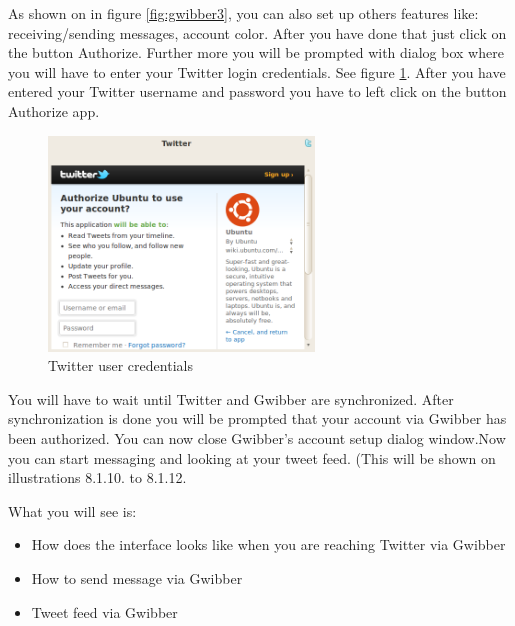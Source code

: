 \par \noindent As shown on in figure \ref{fig:gwibber3}, you can also set up others features like: receiving/sending messages, account color. After you have done that just click on the button Authorize. Further more you will be prompted with dialog box where you will have to enter your Twitter login credentials. See figure \ref{fig:gwibber4}. After you have entered your Twitter username and password you have to left click on the button Authorize app. \\

\begin{figure}[h!]	
	\centering
	\includegraphics[width=200pt]{./images/basic-tasks/gwibber4.png}
	\caption{Twitter user credentials}	
	\label{fig:gwibber4}		
\end{figure}

\par \noindent You will have to wait until Twitter and Gwibber are synchronized. After synchronization is done you will be prompted that your account via Gwibber has been authorized. You can now close Gwibber's account setup dialog window.Now you can start messaging and looking at your tweet feed. (This will be shown on illustrations 8.1.10. to 8.1.12. \\

\par \noindent What you will see is:

\begin{itemize}
\item How does the interface looks like when you are reaching Twitter via Gwibber
\item How to send message via Gwibber
\item Tweet feed via Gwibber
\end{itemize}

